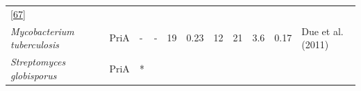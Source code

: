 \documentclass[12pt,twoside]{reedthesis}
\begin{document}
\begin{longtable}[]{@{}lllllllllll@{}}
\begin{minipage}[t]{0.11\columnwidth}
  {[}\protect\hyperlink{ref-verduzco-castro_co-occurrence_2016}{67}{]}\strut
  \end{minipage}\tabularnewline
  \begin{minipage}[t]{0.15\columnwidth}\raggedright\strut
  \emph{Mycobacterium tuberculosis}\strut
  \end{minipage} & \begin{minipage}[t]{0.05\columnwidth}\raggedright\strut
  PriA\strut
  \end{minipage} & \begin{minipage}[t]{0.04\columnwidth}\raggedright\strut
  -\strut
  \end{minipage} & \begin{minipage}[t]{0.04\columnwidth}\raggedright\strut
  -\strut
  \end{minipage} & \begin{minipage}[t]{0.06\columnwidth}\raggedright\strut
  19\strut
  \end{minipage} & \begin{minipage}[t]{0.06\columnwidth}\raggedright\strut
  0.23\strut
  \end{minipage} & \begin{minipage}[t]{0.06\columnwidth}\raggedright\strut
  12\strut
  \end{minipage} & \begin{minipage}[t]{0.05\columnwidth}\raggedright\strut
  21\strut
  \end{minipage} & \begin{minipage}[t]{0.05\columnwidth}\raggedright\strut
  3.6\strut
  \end{minipage} & \begin{minipage}[t]{0.03\columnwidth}\raggedright\strut
  0.17\strut
  \end{minipage} & \begin{minipage}[t]{0.11\columnwidth}\raggedright\strut
  Due et al. (2011)\strut
  \end{minipage}\tabularnewline
  \begin{minipage}[t]{0.15\columnwidth}\raggedright\strut
  \emph{Streptomyces globisporus}\strut
  \end{minipage} & \begin{minipage}[t]{0.05\columnwidth}\raggedright\strut
  PriA\strut
  \end{minipage} & \begin{minipage}[t]{0.04\columnwidth}\raggedright\strut
  *\strut
  \end{minipage} & \begin{minipage}[t]{0.04\columnwidth}\raggedright\strut

\end{minipage}
\end{longtable}
\end{document}
